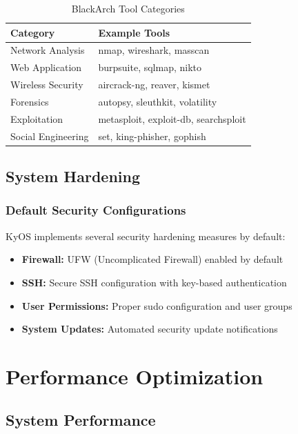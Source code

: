 \documentclass[12pt,a4paper]{article}
\begin{document}
\begin{table}[H]
\centering
\begin{tabular}{@{}ll@{}}
\toprule
\textbf{Category} & \textbf{Example Tools} \\
\midrule
Network Analysis & nmap, wireshark, masscan \\
Web Application & burpsuite, sqlmap, nikto \\
Wireless Security & aircrack-ng, reaver, kismet \\
Forensics & autopsy, sleuthkit, volatility \\
Exploitation & metasploit, exploit-db, searchsploit \\
Social Engineering & set, king-phisher, gophish \\
\bottomrule
\end{tabular}
\caption{BlackArch Tool Categories}
\end{table}

\subsection{System Hardening}

\subsubsection{Default Security Configurations}
KyOS implements several security hardening measures by default:

\begin{itemize}
    \item \textbf{Firewall:} UFW (Uncomplicated Firewall) enabled by default
    \item \textbf{SSH:} Secure SSH configuration with key-based authentication
    \item \textbf{User Permissions:} Proper sudo configuration and user groups
    \item \textbf{System Updates:} Automated security update notifications
\end{itemize}

\section{Performance Optimization}

\subsection{System Performance}
\end{document}
